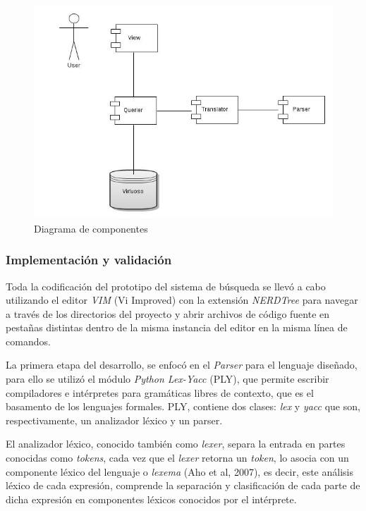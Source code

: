 \begin{itemize}
\begin{figure}[!h]
    \begin{center}
        \includegraphics[scale=0.4]{images/searcher_components.jpg}
        \caption{Diagrama de componentes}
        \label{searcher_architecture}
    \end{center}
\end{figure}

\subsubsection{Implementación y validación}
Toda la codificación del prototipo del sistema de búsqueda se llevó a cabo utilizando el editor \textit{VIM} (Vi Improved) con la extensión \textit{NERDTree} para navegar a través de los directorios del proyecto y abrir archivos de código fuente en pestañas distintas dentro de la misma instancia del editor en la misma línea de comandos.

La primera etapa del desarrollo, se enfocó en el \textit{Parser} para el lenguaje diseñado, para ello se utilizó el módulo \textit{Python Lex-Yacc} (PLY), que permite escribir compiladores e intérpretes para gramáticas libres de contexto, que es el basamento de los lenguajes formales. PLY, contiene dos clases: \textit{lex} y \textit{yacc} que son, respectivamente, un analizador léxico y un parser.

El analizador léxico, conocido también como \textit{lexer}, separa la entrada en partes conocidas como \textit{tokens}, cada vez que el \textit{lexer} retorna un \textit{token}, lo asocia con un componente léxico del lenguaje o \textit{lexema} (Aho et al, 2007), es decir, este análisis léxico de cada expresión, comprende la separación y clasificación de cada parte de dicha expresión en componentes léxicos conocidos por el intérprete.


\end{itemize}
